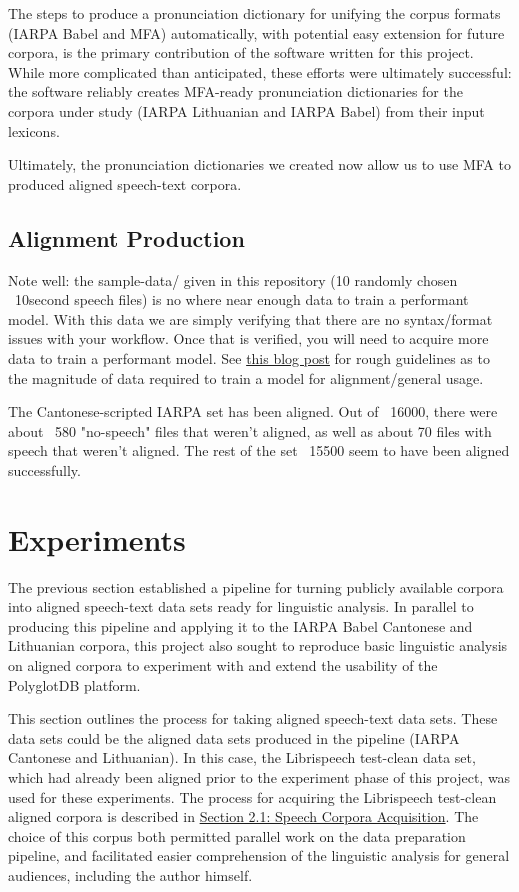 \documentclass[11pt]{article}
\begin{document}
The steps to produce a pronunciation dictionary for unifying the corpus formats (IARPA Babel and MFA) automatically, with potential easy extension for future corpora, is the primary contribution of the software written for this project. While more complicated than anticipated, these efforts were ultimately successful: the software reliably creates MFA-ready pronunciation dictionaries for the corpora under study (IARPA Lithuanian and IARPA Babel) from their input lexicons. 

Ultimately, the pronunciation dictionaries  we created now allow us to use MFA to produced aligned speech-text corpora.

\subsection{Alignment Production}

Note well: the sample-data/ given in this repository (10 randomly chosen ~10second speech files) is no where near enough data to train a performant model. With this data we are simply verifying that there are no syntax/format issues with your workflow. Once that is verified, you will need to acquire more data to train a performant model. See \href{https://memcauliffe.com/how-much-data-do-you-need-for-a-good-mfa-alignment.html}{this blog post} for rough guidelines as to the magnitude of data required to train a model for alignment/general usage.

The Cantonese-scripted IARPA set has been aligned. Out of ~16000, there were about ~580 "no-speech" files that weren't aligned, as well as about 70 files with speech that weren't aligned. The rest of the set ~15500 seem to have been aligned successfully.

\section{Experiments}

The previous section established a pipeline for turning publicly available corpora into aligned speech-text data sets ready for linguistic analysis. In parallel to producing this pipeline and applying it to the IARPA Babel Cantonese and Lithuanian corpora, this project also sought to reproduce basic linguistic analysis on aligned corpora to experiment with and extend the usability of the PolyglotDB platform.

This section outlines the process for taking aligned speech-text data sets. These data sets could be the aligned data sets produced in the pipeline (IARPA Cantonese and Lithuanian). In this case, the Librispeech test-clean data set, which had already been aligned prior to the experiment phase of this project, was used for these experiments. The process for acquiring the Librispeech test-clean aligned corpora is described in \hyperlink{section.21}{Section 2.1: Speech Corpora Acquisition}. The choice of this corpus both permitted parallel work on the data preparation pipeline, and facilitated easier comprehension of the linguistic analysis for general audiences, including the author himself.
\end{document}
